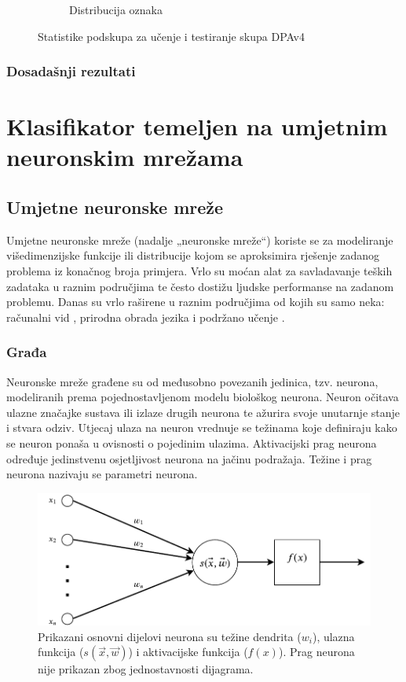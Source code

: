\documentclass[times, utf8, numeric, diplomski]{fer}
\begin{document}
\begin{figure}[H]
\begin{subfigure}{.5\textwidth}
\centering
\caption{Distribucija oznaka}
\label{fig:dpa4_test_outputs}
\end{subfigure}
\caption{Statistike podskupa za učenje i testiranje skupa DPAv4}
\end{figure}

\subsection{Dosadašnji rezultati}


\chapter{Klasifikator temeljen na umjetnim neuronskim mrežama}

\section{Umjetne neuronske mreže}
Umjetne neuronske mreže (nadalje „neuronske mreže“) koriste se za modeliranje višedimenzijske funkcije ili distribucije kojom se aproksimira rješenje zadanog problema iz konačnog broja primjera. Vrlo su moćan alat za savladavanje teških zadataka u raznim područjima te često dostižu ljudske performanse na zadanom problemu. Danas su vrlo raširene u raznim područjima od kojih su samo neka: računalni vid \citep{alexnet,yolo}, prirodna obrada jezika \citep{word2vec,char_cnn} i podržano učenje \citep{atari,active_learn}.

\subsection{Građa}
Neuronske mreže građene su od međusobno povezanih jedinica, tzv. neurona, modeliranih prema pojednostavljenom modelu biološkog neurona. Neuron očitava ulazne značajke sustava ili izlaze drugih neurona te ažurira svoje unutarnje stanje i stvara odziv. Utjecaj ulaza na neuron vrednuje se težinama  koje definiraju kako se neuron ponaša u ovisnosti o pojedinim ulazima. Aktivacijski prag neurona  određuje jedinstvenu osjetljivost neurona na jačinu podražaja. Težine i prag neurona nazivaju se parametri neurona.

\begin{figure}[h]
\centering
\includegraphics[scale=0.7]{Neuron.pdf}
\caption{Prikazani osnovni dijelovi neurona su težine dendrita ($w_i$), ulazna funkcija ($s(\vec{x},\vec{w})$) i aktivacijske funkcija ($f(x)$). Prag neurona nije prikazan zbog jednostavnosti dijagrama.}
\label{fig:neuron}
\end{figure}
\end{document}
